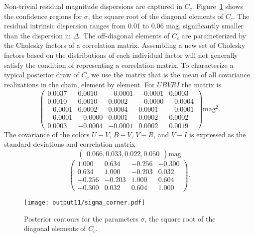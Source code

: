 \documentclass{aastex}   	%
\begin{document}
Non-trivial residual magnitude dispersions are captured in $C_c$.   Figure~\ref{sigma:fig} shows the confidence regions for $\sigma$, the
square root of the diagonal elements of $C_c$.  The residual intrinsic dispersion ranges from 0.01 to 0.06 mag, significantly smaller
than the dispersion in $\Delta$.
The off-diagonal elements of $C_c$ are parameterized by the Cholesky factors of a correlation matrix.
Assembling
a new set of Cholesky factors based on the distributions of each individual factor will not generally satisfy the condition of representing a correlation matrix.  
To characterize a typical posterior draw of $C_c$ we use the matrix that is the mean of all covariance realizations in the
chain, element by element.
For $UBVRI$ the matrix is
\begin{equation}
\begin{pmatrix}
0.0037 & 0.0010 & -0.0001 & -0.0001 & 0.0003 \\
0.0010 & 0.0010 & 0.0002 & -0.0000 & -0.0004 \\
-0.0001 & 0.0002 & 0.0004 & 0.0001 & -0.0001 \\
-0.0001 & -0.0000 & 0.0001 & 0.0002 & 0.0002 \\
0.0003 & -0.0004 & -0.0001 & 0.0002 & 0.0019
 \end{pmatrix} \text{mag}^2.
 \end{equation}
The  covariance of the colors $U-V$, $B-V$, $V-R$, and $V-I$ is
expressed as the standard deviations and
 correlation matrix
 \begin{equation}
 \begin{pmatrix}
0.066 , 0.033 , 0.022 , 0.050 
  \end{pmatrix} \text{mag}
 \label{color_sd:eqn}
   \end{equation}
 \begin{equation}
\begin{pmatrix}
1.000 & 0.634 & -0.256 & -0.300 \\
0.634 & 1.000 & -0.203 & 0.032 \\
-0.256 & -0.203 & 1.000 & 0.604 \\
-0.300 & 0.032 & 0.604 & 1.000
  \end{pmatrix}.
  \label{color_cor:eqn}
 \end{equation}
 
 \begin{figure}[htbp] %
   \centering
   \texttt{[image: output11/sigma\_corner.pdf]} 
   \caption{Posterior contours for the parameters $\sigma$, the square root of the diagonal elements of $C_c$.
   \label{sigma:fig}}
\end{figure}
\end{document}
